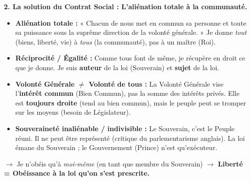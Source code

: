 \documentclass[11pt]{article}
\begin{document}
\begin{exoresolu}
\textbf{2. La solution du Contrat Social : L'aliénation totale à la communauté.}
\begin{itemize}
    \item \textbf{Aliénation totale :} « Chacun de nous met en commun sa personne et toute sa puissance sous la suprême direction de la volonté générale. » Je donne \emph{tout} (biens, liberté, vie) à \emph{tous} (la communauté), pas à un maître (Roi).
    \item \textbf{Réciprocité / Égalité :} Comme tous font de même, je récupère en droit ce que je donne. Je suis \textbf{auteur} de la loi (Souverain) et \textbf{sujet} de la loi.
    \item \textbf{Volonté Générale $\neq$ Volonté de tous :} La Volonté Générale vise l'\textbf{intérêt commun} (Bien Commun), pas la somme des intérêts privés. Elle est \textbf{toujours droite} (tend au bien commun), mais le peuple peut se tromper sur les moyens (besoin de Législateur).
    \item \textbf{Souveraineté inaliénable / indivisible :} Le Souverain, c'est le Peuple réuni. Il ne peut être représenté (critique du parlementarisme anglais). La loi émane du Souverain ; le Gouvernement (Prince) n'est qu'exécuteur.
\end{itemize}
$\rightarrow$ Je n'obéis qu'à \emph{moi-même} (en tant que membre du Souverain) $\rightarrow$ \textbf{Liberté = Obéissance à la loi qu'on s'est prescrite.}


\end{exoresolu}
\end{document}
